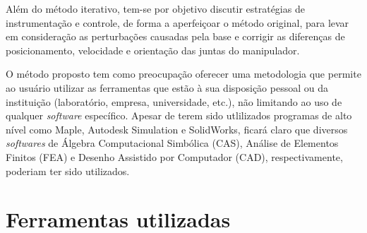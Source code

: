 Além do método iterativo, tem-se por objetivo discutir estratégias de
instrumentação e controle, de forma a aperfeiçoar o método original, para levar
em consideração as perturbações causadas pela base e corrigir as diferenças de
posicionamento, velocidade e orientação das juntas do manipulador.

O método proposto tem como preocupação oferecer uma metodologia que permite ao
usuário utilizar as ferramentas que estão à sua disposição pessoal ou da
instituição (laboratório, empresa, universidade, etc.), não limitando ao uso de
qualquer \textit{software} específico. Apesar de terem sido utlilizados
programas de alto nível como Maple, Autodesk Simulation e SolidWorks, ficará
claro que diversos \textit{softwares} de Álgebra Computacional Simbólica (CAS),
Análise de Elementos Finitos (FEA) e Desenho Assistido por Computador (CAD),
respectivamente, poderiam ter sido utilizados.


\section{Ferramentas utilizadas}


